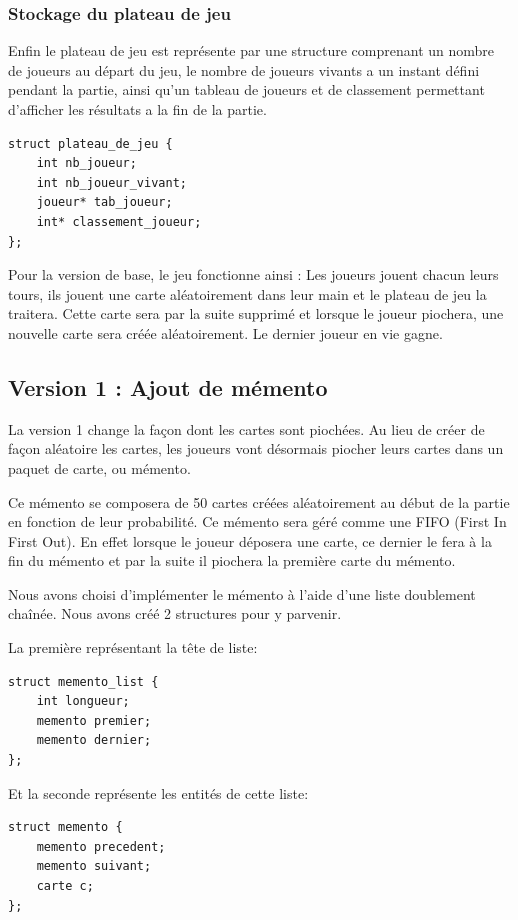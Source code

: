 \documentclass[10pt,a4paper]{article}
\begin{document}
\subsubsection{Stockage du plateau de jeu}
Enfin le plateau de jeu est représente par une structure comprenant un nombre de joueurs au départ du jeu, le nombre de joueurs vivants a un instant défini pendant la partie, ainsi qu'un tableau de joueurs et de classement permettant d'afficher les résultats a la fin de la partie.

\begin{verbatim}
struct plateau_de_jeu {
    int nb_joueur;
    int nb_joueur_vivant;
    joueur* tab_joueur;
    int* classement_joueur;
};
\end{verbatim}


Pour la version de base, le jeu fonctionne ainsi :
Les joueurs jouent chacun leurs tours, ils jouent une carte aléatoirement dans leur main et le plateau de jeu la traitera. Cette carte sera par la suite supprimé et lorsque le joueur piochera, une nouvelle carte sera créée aléatoirement. Le dernier joueur en vie gagne.

\newpage
\subsection{Version 1 : Ajout de mémento}
La version 1 change la façon dont les cartes sont piochées. Au lieu de créer de façon aléatoire les cartes, les joueurs vont désormais piocher leurs cartes dans un paquet de carte, ou mémento. 

Ce mémento se composera de 50 cartes créées aléatoirement au début de la partie en fonction de leur probabilité.
Ce mémento sera géré comme une FIFO (First In First Out). En effet lorsque le joueur déposera une carte, ce dernier le fera à la fin du mémento et par la suite il piochera la première carte du mémento.

Nous avons choisi d'implémenter le mémento à l'aide d'une liste doublement chaînée. 
Nous avons créé 2 structures pour y parvenir. 

La première représentant la tête de liste:
\begin{verbatim}
struct memento_list {
    int longueur;
    memento premier;
    memento dernier;
};
\end{verbatim}

Et la seconde représente les entités de cette liste:
\begin{verbatim}
struct memento {
    memento precedent;
    memento suivant;
    carte c;
};
\end{verbatim}
\end{document}
